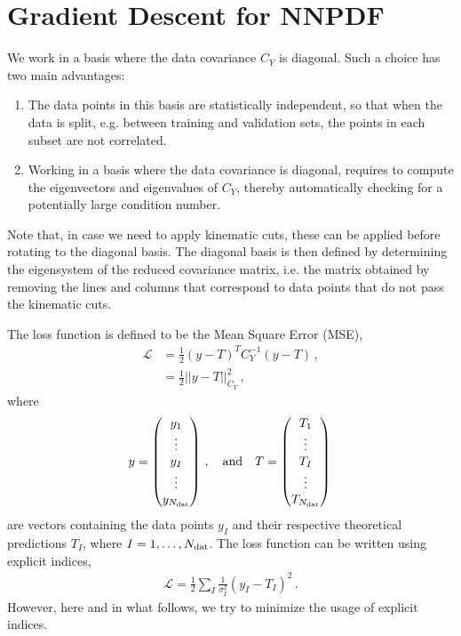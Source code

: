 \documentclass[11pt]{article}
\begin{document}
\section{Gradient Descent for NNPDF}
\label{sec:GradDescNNPDF}

We work in a basis where the data covariance $C_Y$ is diagonal. Such a choice has two main advantages:
\begin{enumerate}
    \item The data points in this basis are statistically independent, so that when the data is split, 
    e.g. between training and validation sets, the points in each subset are not correlated. 
    \item Working in a basis where the data covariance is diagonal, requires to compute the eigenvectors
    and eigenvalues of $C_Y$, thereby automatically checking for a potentially large condition number. 
\end{enumerate}
Note that, in case we need to apply kinematic cuts, these can be applied before rotating to the diagonal basis. The diagonal basis is then defined by determining the eigensystem of the reduced covariance matrix, i.e. the matrix obtained by removing the lines and columns that correspond to data points that do not pass the kinematic cuts.  

The loss function is defined to be the Mean Square Error (MSE),
\begin{align}
    \label{eq:MSELoss}
    \mathcal{L} &= \frac12 \left(y - T\right)^T C_Y^{-1} \left(y - T\right)\, , \\
        &= \frac12 ||y-T||^2_{C_Y}\, ,
\end{align}
where 
\begin{align}
    \label{eq:DataAndTheory}
    y = 
        \begin{pmatrix}
            y_1 \\
            \vdots \\
            y_I \\
            \vdots \\
            y_{N_{\mathrm{dat}}}
        \end{pmatrix}\, , 
    \quad \mathrm{and} \quad 
    T = 
        \begin{pmatrix}
            T_1 \\
            \vdots \\
            T_I \\
            \vdots \\
            T_{N_{\mathrm{dat}}}
        \end{pmatrix}\, 
\end{align}
are vectors containing the data points $y_I$ and their respective theoretical predictions $T_I$, where $I=1, \dots, N_{\mathrm{dat}}$. The loss function can be written using explicit indices, 
\begin{align}
    \label{eq:MSELossWithIndices}
    \mathcal{L} = \frac12 \sum_I \frac{1}{\sigma_I^2} \left(y_I - T_I\right)^2\, .
\end{align}
However, here and in what follows, we try to minimize the usage of explicit indices.
\end{document}
